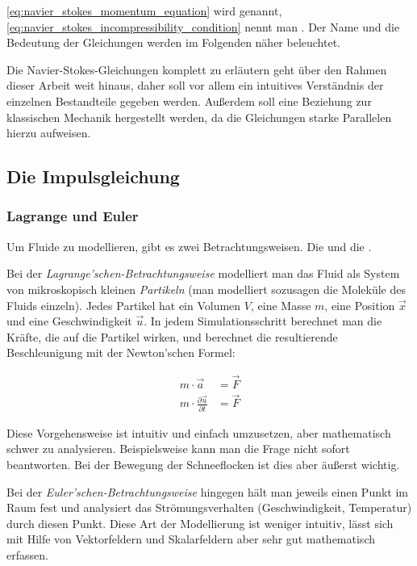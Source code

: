 \autoref{eq:navier_stokes_momentum_equation} wird
 genannt,
\autoref{eq:navier_stokes_incompressibility_condition} nennt man
. Der Name und die Bedeutung der
Gleichungen werden im Folgenden näher beleuchtet.

Die Navier-Stokes-Gleichungen komplett zu erläutern geht über den Rahmen dieser
Arbeit weit hinaus, daher soll vor allem ein intuitives Verständnis der
einzelnen Bestandteile gegeben werden. Außerdem soll eine Beziehung zur
klassischen Mechanik hergestellt werden, da die Gleichungen starke Parallelen
hierzu aufweisen.

\subsection{Die Impulsgleichung}

\subsubsection{Lagrange und Euler}

Um Fluide zu modellieren, gibt es zwei Betrachtungsweisen. Die
 und die
.

Bei der \emph{Lagrange'schen-Betrachtungsweise} modelliert man das
Fluid als System von mikroskopisch kleinen \emph{Partikeln} (man
modelliert sozusagen die Moleküle des Fluids einzeln). Jedes Partikel
hat ein Volumen $V$, eine Masse $m$, eine Position $\vec{x}$ und eine
Geschwindigkeit $\vec{u}$. In jedem Simulationsschritt berechnet man
die Kräfte, die auf die Partikel wirken, und berechnet die
resultierende Beschleunigung mit der Newton'schen Formel:

\begin{align*}
m \cdot \vec{a} &= \vec{F} \\
m \cdot \frac{\partial \vec{u}}{\partial t} &= \vec{F}
\end{align*}

Diese Vorgehensweise ist intuitiv und einfach umzusetzen, aber mathematisch
schwer zu analysieren. Beispielsweise kann man die Frage  nicht sofort
beantworten. Bei der Bewegung der Schneeflocken ist dies aber äußerst
wichtig.

Bei der \emph{Euler'schen-Betrachtungsweise} hingegen hält man jeweils einen Punkt im
Raum fest und analysiert das Strömungsverhalten (Geschwindigkeit, Temperatur)
durch diesen Punkt. Diese Art der Modellierung ist weniger intuitiv, lässt sich
mit Hilfe von Vektorfeldern und Skalarfeldern aber sehr gut mathematisch erfassen.

